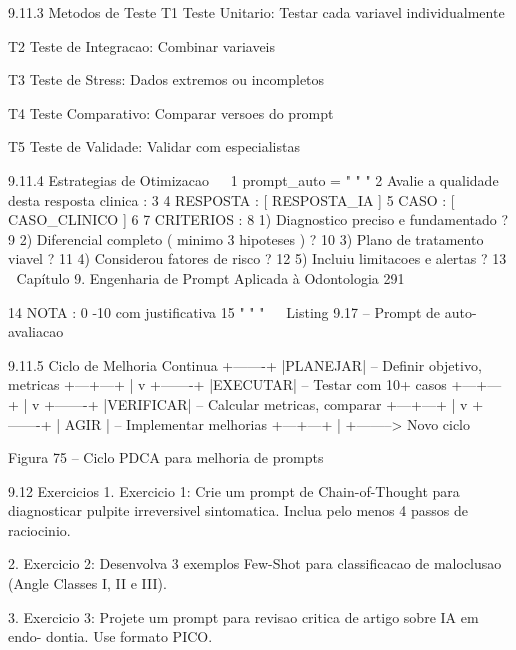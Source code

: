      9.11.3      Metodos de Teste
         T1 Teste Unitario: Testar cada variavel individualmente

         T2 Teste de Integracao: Combinar variaveis

         T3 Teste de Stress: Dados extremos ou incompletos

         T4 Teste Comparativo: Comparar versoes do prompt

         T5 Teste de Validade: Validar com especialistas

     9.11.4      Estrategias de Otimizacao
                                                                                      
 1   prompt_auto = " " "
 2   Avalie a qualidade desta resposta clinica :
 3
 4   RESPOSTA : [ RESPOSTA_IA ]
 5   CASO : [ CASO_CLINICO ]
 6
 7   CRITERIOS :
 8   1) Diagnostico preciso e fundamentado ?
 9   2) Diferencial completo ( minimo 3 hipoteses ) ?
10   3) Plano de tratamento viavel ?
11   4) Considerou fatores de risco ?
12   5) Incluiu limitacoes e alertas ?
13
  Capítulo 9. Engenharia de Prompt Aplicada à Odontologia                          291


14 NOTA : 0 -10 com justificativa
15 " " "
                                                                                         
                           Listing 9.17 – Prompt de auto-avaliacao


  9.11.5     Ciclo de Melhoria Continua
        +-------+
        |PLANEJAR| -- Definir objetivo, metricas
        +---+---+
            |
            v
        +-------+
        |EXECUTAR| -- Testar com 10+ casos
        +---+---+
            |
            v
        +-------+
        |VERIFICAR| -- Calcular metricas, comparar
        +---+---+
            |
            v
        +-------+
        | AGIR | -- Implementar melhorias
        +---+---+
            |
            +--------> Novo ciclo

                     Figura 75 – Ciclo PDCA para melhoria de prompts



  9.12      Exercicios
     1. Exercicio 1: Crie um prompt de Chain-of-Thought para diagnosticar pulpite
        irreversivel sintomatica. Inclua pelo menos 4 passos de raciocinio.

     2. Exercicio 2: Desenvolva 3 exemplos Few-Shot para classificacao de maloclusao
        (Angle Classes I, II e III).

     3. Exercicio 3: Projete um prompt para revisao critica de artigo sobre IA em endo-
        dontia. Use formato PICO.

